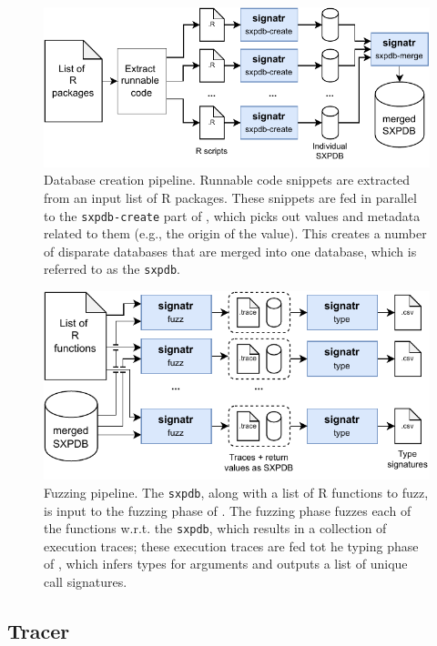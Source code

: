 \documentclass[sigplan,anonymous,review]{acmart}
\begin{document}
\begin{figure}
    \centering
    \includegraphics[width=\columnwidth]{code-and-figures/sxdb-pipeline.pdf}
    \caption{
    Database creation pipeline.
    Runnable code snippets are extracted from an input list of R packages.
    These snippets are fed in parallel to the {\tt sxpdb-create} part of \tool, which picks out values and metadata related to them (e.g., the origin of the value). 
    This creates a number of disparate databases that are merged into one database, which is referred to as the {\tt sxpdb}.
    }\label{fig:sxpdb-pipeline}
\end{figure}

\begin{figure}
    \centering
    \includegraphics[width=\columnwidth]{code-and-figures/fuzz-pipeline.pdf}
    \caption{
    Fuzzing pipeline.
    The {\tt sxpdb}, along with a list of R functions to fuzz, is input to the fuzzing phase of \tool.
    The fuzzing phase fuzzes each of the functions w.r.t. the {\tt sxpdb}, which results in a collection of execution traces; these execution traces are fed tot he typing phase of \tool, which infers types for arguments and outputs a list of unique call signatures.
    }\label{fig:fuzz-pipeline}
\end{figure}

\subsection{Tracer}
\end{document}
